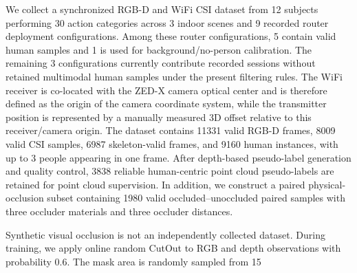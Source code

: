 
We collect a synchronized RGB-D and WiFi CSI dataset from 12 subjects performing 30 action categories across 3 indoor scenes and 9 recorded router deployment configurations. Among these router configurations, 5 contain valid human samples and 1 is used for background/no-person calibration. The remaining 3 configurations currently contribute recorded sessions without retained multimodal human samples under the present filtering rules. The WiFi receiver is co-located with the ZED-X camera optical center and is therefore defined as the origin of the camera coordinate system, while the transmitter position is represented by a manually measured 3D offset relative to this receiver/camera origin. The dataset contains 11331 valid RGB-D frames, 8009 valid CSI samples, 6987 skeleton-valid frames, and 9160 human instances, with up to 3 people appearing in one frame. After depth-based pseudo-label generation and quality control, 3838 reliable human-centric point cloud pseudo-labels are retained for point cloud supervision. In addition, we construct a paired physical-occlusion subset containing 1980 valid occluded--unoccluded paired samples with three occluder materials and three occluder distances.

Synthetic visual occlusion is not an independently collected dataset. During training, we apply online random CutOut to RGB and depth observations with probability 0.6. The mask area is randomly sampled from 15%


